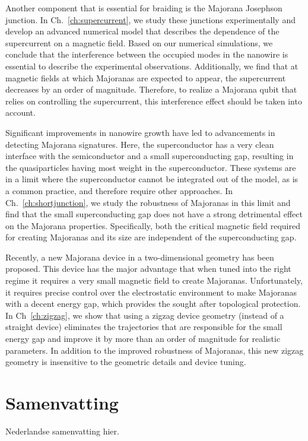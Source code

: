 Another component that is essential for braiding is the Majorana Josephson junction.
In Ch.~\ref{ch:supercurrent}, we study these junctions experimentally and develop an advanced numerical model that describes the dependence of the supercurrent on a magnetic field.
Based on our numerical simulations, we conclude that the interference between the occupied modes in the nanowire is essential to describe the experimental observations.
Additionally, we find that at magnetic fields at which Majoranas are expected to appear, the supercurrent decreases by an order of magnitude.
Therefore, to realize a Majorana qubit that relies on controlling the supercurrent, this interference effect should be taken into account.

Significant improvements in nanowire growth have led to advancements in detecting Majorana signatures.
Here, the superconductor has a very clean interface with the semiconductor and a small superconducting gap, resulting in the quasiparticles having most weight in the superconductor.
These systems are in a limit where the superconductor cannot be integrated out of the model, as is a common practice, and therefore require other approaches.
In Ch.~\ref{ch:shortjunction}, we study the robustness of Majoranas in this limit and find that the small superconducting gap does not have a strong detrimental effect on the Majorana properties.
Specifically, both the critical magnetic field required for creating Majoranas and its size are independent of the superconducting gap.

Recently, a new Majorana device in a two-dimensional geometry has been proposed.
This device has the major advantage that when tuned into the right regime it requires a very small magnetic field to create Majoranas.
Unfortunately, it requires precise control over the electrostatic environment to make Majoranas with a decent energy gap, which provides the sought after topological protection.
In Ch~\ref{ch:zigzag}, we show that using a zigzag device geometry (instead of a straight device) eliminates the trajectories that are responsible for the small energy gap and improve it by more than an order of magnitude for realistic parameters.
In addition to the improved robustness of Majoranas, this new zigzag geometry is insensitive to the geometric details and device tuning.

\chapter*{Samenvatting}
{

Nederlandse samenvatting hier.

}